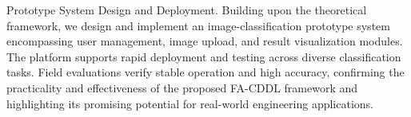 {Prototype System Design and Deployment. Building upon the theoretical framework, we design and implement an image-classification prototype system encompassing user management, image upload, and result visualization modules. The platform supports rapid deployment and testing across diverse classification tasks. Field evaluations verify stable operation and high accuracy, confirming the practicality and effectiveness of the proposed FA-CDDL framework and highlighting its promising potential for real-world engineering applications.
}%

\makeabstract{} %
